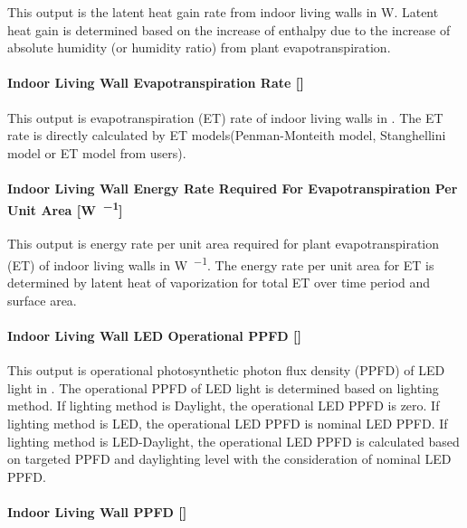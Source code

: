 This output is the latent heat gain rate from indoor living walls in W. Latent heat gain is determined based on the increase of enthalpy due to the increase of absolute humidity (or humidity ratio) from plant evapotranspiration.

\paragraph{Indoor Living Wall Evapotranspiration Rate {[}\si{\evapotranspirationRate}{]}}\label{indoor-living-wall-evapotranspiration-rate}

This output is evapotranspiration (ET) rate of indoor living walls in \si{\evapotranspirationRate}. The ET rate is directly calculated by ET models(Penman-Monteith model, Stanghellini model or ET model from users).

\paragraph{Indoor Living Wall Energy Rate Required For Evapotranspiration Per Unit Area {[}\si{\watt\per\area}{]}}\label{indoor-living-wall-evapotranspiration-per-unit-area}

This output is energy rate per unit area required for plant evapotranspiration (ET) of indoor living walls in \si{\watt\per\area}. The energy rate per unit area for ET is determined by latent heat of vaporization for total ET over time period and surface area.

\paragraph{Indoor Living Wall LED Operational PPFD {[}\si{\umolperAreaperSecond}{]}}\label{indoor-living-wall-led-operational-ppfd}

This output is operational photosynthetic photon flux density (PPFD) of LED light in \si{\umolperAreaperSecond}. The operational PPFD of LED light is determined based on lighting method. If lighting method is Daylight, the operational LED PPFD is zero. If lighting method is LED, the operational LED PPFD is nominal LED PPFD. If lighting method is LED-Daylight, the operational LED PPFD is calculated based on targeted PPFD and daylighting level with the consideration of nominal LED PPFD.

\paragraph{Indoor Living Wall PPFD {[}\si{\umolperAreaperSecond}{]}}\label{indoor-living-wall-ppfd}

